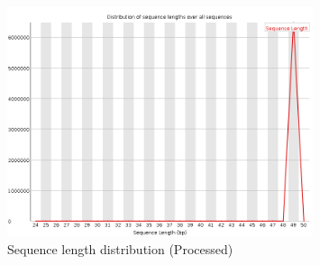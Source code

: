 \documentclass[UTF8]{ctexart}
\begin{document}
\begin{figure}[!htb]
	\centering
	\includegraphics[width=0.8\textwidth]{img/SRR14325859_FastQC_Processed_img/sequence_length_distribution.png}	
	\caption{Sequence length distribution (Processed)\protect}    
\end{figure}
\end{document}
